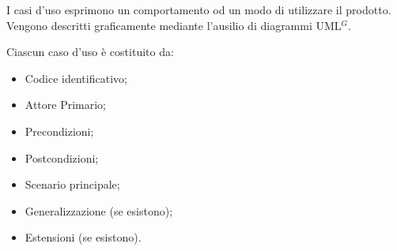 

    I casi d’uso esprimono un comportamento od un modo di utilizzare il prodotto. \\
    Vengono descritti graficamente mediante l’ausilio di diagrammi UML$^{G}$. 

    Ciascun caso d’uso è costituito da:
    \begin{itemize}
        \item Codice identificativo;
        \item Attore Primario;
        \item Precondizioni;
        \item Postcondizioni;
        \item Scenario principale;
        \item Generalizzazione (se esistono);
        \item Estensioni (se esistono).
        
    \end{itemize}
    


 